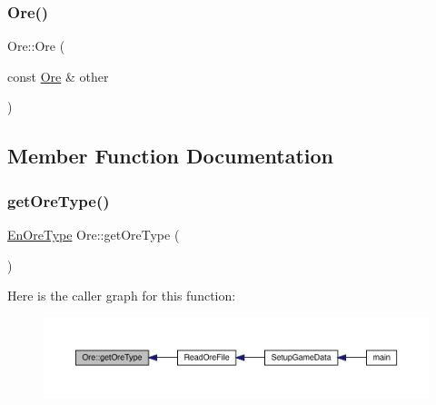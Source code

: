 \mbox{\label{class_ore_a06914cddcedb828081b0183a46db6ac5}} 
\subsubsection{\texorpdfstring{Ore()}{Ore()}\hspace{0.1cm}{\footnotesize\ttfamily [2/2]}}
{\footnotesize\ttfamily Ore\+::\+Ore (\begin{DoxyParamCaption}\item[{const \mbox{\hyperlink{class_ore}{Ore}} \&}]{other }\end{DoxyParamCaption})}



\subsection{Member Function Documentation}
\mbox{\label{class_ore_a77e26bca7317ab83d19dbf8695bcebb6}} 
\subsubsection{\texorpdfstring{get\+Ore\+Type()}{getOreType()}}
{\footnotesize\ttfamily \mbox{\hyperlink{_ore_8hpp_a4dd6f8b19eecee73049dd69be5803f14}{En\+Ore\+Type}} Ore\+::get\+Ore\+Type (\begin{DoxyParamCaption}{ }\end{DoxyParamCaption})}

Here is the caller graph for this function\+:
\nopagebreak
\begin{figure}[H]
\begin{center}
\leavevmode
\includegraphics[width=350pt]{class_ore_a77e26bca7317ab83d19dbf8695bcebb6_icgraph}
\end{center}
\end{figure}
\mbox{\label{class_ore_ac00c9de7ec899518c864199a18b52eac}} 
